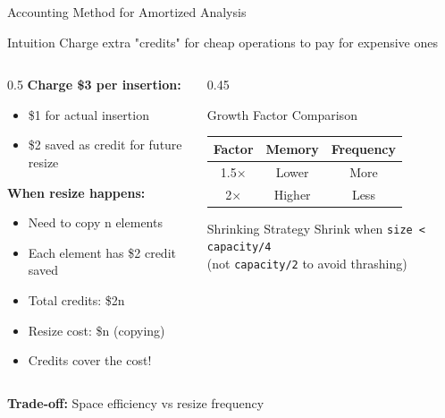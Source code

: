 \documentclass[aspectratio=169,xcolor=dvipsnames]{beamer}
\begin{document}
\begin{frame}{Accounting Method for Amortized Analysis}
  \begin{block}{Intuition}
    Charge extra "credits" for cheap operations to pay for expensive ones
  \end{block}

  \vspace{0.3cm}

  \begin{columns}
    \begin{column}{0.5\textwidth}
      \textbf{Charge \$3 per insertion:}
      \begin{itemize}
        \item \$1 for actual insertion
        \item \$2 saved as credit for future resize
      \end{itemize}

      \vspace{0.3cm}

      \textbf{When resize happens:}
      \begin{itemize}
        \item Need to copy n elements
        \item Each element has \$2 credit saved
        \item Total credits: \$2n
        \item Resize cost: \$n (copying)
        \item Credits cover the cost!
      \end{itemize}
    \end{column}
    \begin{column}{0.45\textwidth}
      \begin{exampleblock}{Growth Factor Comparison}
        \begin{tabular}{c|c|c}
          \textbf{Factor} & \textbf{Memory} & \textbf{Frequency} \\
          \hline
          1.5× & Lower & More \\
          2× & Higher & Less \\
        \end{tabular}
      \end{exampleblock}

      \vspace{0.3cm}

      \begin{alertblock}{Shrinking Strategy}
        Shrink when \texttt{size < capacity/4} \\
        (not \texttt{capacity/2} to avoid thrashing)
      \end{alertblock}
    \end{column}
  \end{columns}

  \vspace{0.3cm}

  \begin{center}
    \textbf{Trade-off:} Space efficiency vs resize frequency
  \end{center}
\end{frame}
\end{document}
